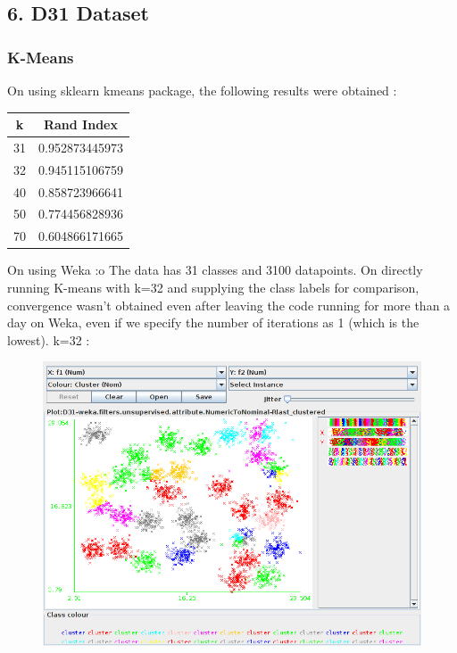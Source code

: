 \documentclass[paper=a4, fontsize=11pt]{scrartcl}
\numberwithin{equation}{section}		%
\numberwithin{figure}{section}			%
\numberwithin{table}{section}				%
\begin{document}
\subsection*{6. D31 Dataset}
\subsubsection*{K-Means}
On using sklearn kmeans package, the following results were obtained :
\begin{table}[H]
\label{T:equipos}
\begin{center}
\begin{tabular}{| c | c |}
\hline
\textbf{k} & \textbf{Rand Index} \\
\hline

31 & 0.952873445973 \\ \hline
32 & 0.945115106759 \\ \hline
40 & 0.858723966641 \\ \hline
50 & 0.774456828936 \\ \hline
70 & 0.604866171665 \\ \hline

\end{tabular}
\end{center}
\end{table}

On using Weka :o
The data has 31 classes and 3100 datapoints. On directly running K-means with k=32 and supplying the class labels for comparison, convergence wasn't obtained even after leaving the code running for more than a day on Weka, even if we specify the number of iterations as 1 (which is the lowest). k=32 :

\begin{figure}[H]
	\centering
  \includegraphics[width=1\textwidth]{6a}{\label{k=32: f1 vs f2}}
\end{figure}
\end{document}

